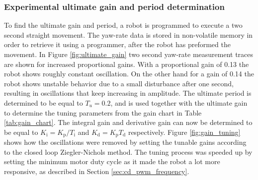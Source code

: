 \subsubsection{Experimental ultimate gain and period determination}

To find the ultimate gain and period, a robot is programmed to execute a two second straight movement.
The yaw-rate data is stored in non-volatile memory in order to retrieve it using a programmer, after the robot has preformed the movement.
In Figure \ref{fig:ultimate_gain} two second yaw-rate measurement traces are shown for increased proportional gains.
With a proportional gain of 0.13 the robot shows roughly constant oscillation.
On the other hand for a gain of 0.14 the robot shows unstable behavior due to a small disturbance after one second, resulting in oscillations that keep increasing in amplitude.
The ultimate period is determined to be equal to $T_{u} = 0.2$, and is used together with the ultimate gain to determine the tuning parameters from the gain chart in Table \ref{tab:gain_chart}.
The integral gain and derivative gain can now be determined to be equal to $K_{\text{i}}  = K_{\text{p}} / T_{\text{i}}$ and $K_{\text{d}}  = K_{\text{p}}T_{\text{d}}$ respectively.
Figure \ref{fig:gain_tuning} shows how the oscillations were removed by setting the tunable gains according to the closed loop Ziegler-Nichols method.
The tuning process was speeded up by setting the minimum motor duty cycle as it made the robot a lot more responsive, as described in Section \ref{sec:cd_pwm_frequency}.


